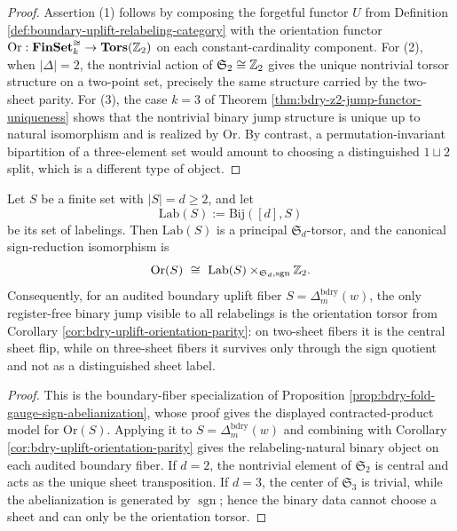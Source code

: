 \begin{proof}
Assertion (1) follows by composing the forgetful functor \(U\) from Definition \ref{def:boundary-uplift-relabeling-category} with the orientation functor \(\mathrm{Or}:\mathbf{FinSet}_k^{\cong}\to\mathbf{Tors}(\mathbb{Z}_2)\) on each constant-cardinality component.
For (2), when \(|\Delta|=2\), the nontrivial action of \(\mathfrak{S}_2\cong\mathbb{Z}_2\) gives the unique nontrivial torsor structure on a two-point set, precisely the same structure carried by the two-sheet parity.
For (3), the case \(k=3\) of Theorem \ref{thm:bdry-z2-jump-functor-uniqueness} shows that the nontrivial binary jump structure is unique up to natural isomorphism and is realized by \(\mathrm{Or}\).
By contrast, a permutation-invariant bipartition of a three-element set would amount to choosing a distinguished \(1\sqcup 2\) split, which is a different type of object. \qedhere
\end{proof}

\begin{proposition}\label{prop:uplift-fiber-sign-dimension-reduction}
Let \(S\) be a finite set with \(|S|=d\ge 2\), and let
\[
\mathrm{Lab}(S):=\mathrm{Bij}([d],S)
\]
be its set of labelings.
Then \(\mathrm{Lab}(S)\) is a principal \(\mathfrak{S}_d\)-torsor, and the canonical sign-reduction isomorphism is
\[
\mathrm{Or}(S)\ \cong\ \mathrm{Lab}(S)\times_{\mathfrak{S}_d,\operatorname{sgn}}\ZZ_2.
\]
Consequently, for an audited boundary uplift fiber \(S=\Delta_m^{\mathrm{bdry}}(w)\), the only register-free binary jump visible to all relabelings is the orientation torsor from Corollary \ref{cor:bdry-uplift-orientation-parity}: on two-sheet fibers it is the central sheet flip, while on three-sheet fibers it survives only through the sign quotient and not as a distinguished sheet label.
\end{proposition}

\begin{proof}
This is the boundary-fiber specialization of Proposition \ref{prop:bdry-fold-gauge-sign-abelianization}, whose proof gives the displayed contracted-product model for \(\mathrm{Or}(S)\).  Applying it to \(S=\Delta_m^{\mathrm{bdry}}(w)\) and combining with Corollary \ref{cor:bdry-uplift-orientation-parity} gives the relabeling-natural binary object on each audited boundary fiber.  If \(d=2\), the nontrivial element of \(\mathfrak S_2\) is central and acts as the unique sheet transposition.  If \(d=3\), the center of \(\mathfrak S_3\) is trivial, while the abelianization is generated by \(\operatorname{sgn}\); hence the binary data cannot choose a sheet and can only be the orientation torsor. \qedhere
\end{proof}
